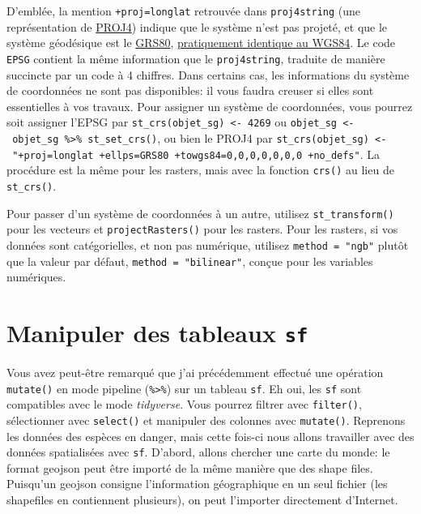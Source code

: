 \documentclass[]{book}
\begin{document}
D'emblée, la mention \texttt{+proj=longlat} retrouvée dans
\texttt{proj4string} (une représentation de
\href{https://proj4.org/}{PROJ4}) indique que le système n'est pas
projeté, et que le système géodésique est le
\href{https://en.wikipedia.org/wiki/Geodetic_Reference_System_1980}{GRS80},
\href{https://mern.gouv.qc.ca/territoire/outils/outils-faq.jsp}{pratiquement
identique au WGS84}. Le code \texttt{EPSG} contient la même information
que le \texttt{proj4string}, traduite de manière succincte par un code à
4 chiffres. Dans certains cas, les informations du système de
coordonnées ne sont pas disponibles: il vous faudra creuser si elles
sont essentielles à vos travaux. Pour assigner un système de
coordonnées, vous pourrez soit assigner l'EPSG par
\texttt{st\_crs(objet\_sg)\ \textless{}-\ 4269} ou
\texttt{objet\_sg\ \textless{}-\ objet\_sg\ \%\textgreater{}\%\ st\_set\_crs()},
ou bien le PROJ4 par
\texttt{st\_crs(objet\_sg)\ \textless{}-\ "+proj=longlat\ +ellps=GRS80\ +towgs84=0,0,0,0,0,0,0\ +no\_defs"}.
La procédure est la même pour les rasters, mais avec la fonction
\texttt{crs()} au lieu de \texttt{st\_crs()}.

Pour passer d'un système de coordonnées à un autre, utilisez
\texttt{st\_transform()} pour les vecteurs et \texttt{projectRasters()}
pour les rasters. Pour les rasters, si vos données sont catégorielles,
et non pas numérique, utilisez \texttt{method\ =\ "ngb"} plutôt que la
valeur par défaut, \texttt{method\ =\ "bilinear"}, conçue pour les
variables numériques.

\hypertarget{manipuler-des-tableaux-sf}{%
\section{\texorpdfstring{Manipuler des tableaux
\texttt{sf}}{Manipuler des tableaux sf}}\label{manipuler-des-tableaux-sf}}

Vous avez peut-être remarqué que j'ai précédemment effectué une
opération \texttt{mutate()} en mode pipeline
(\texttt{\%\textgreater{}\%}) sur un tableau \texttt{sf}. Eh oui, les
\texttt{sf} sont compatibles avec le mode \emph{tidyverse}. Vous pourrez
filtrer avec \texttt{filter()}, sélectionner avec \texttt{select()} et
manipuler des colonnes avec \texttt{mutate()}. Reprenons les données des
espèces en danger, mais cette fois-ci nous allons travailler avec des
données spatialisées avec \texttt{sf}. D'abord, allons chercher une
carte du monde: le format geojson peut être importé de la même manière
que des shape files. Puisqu'un geojson consigne l'information
géographique en un seul fichier (les shapefiles en contiennent
plusieurs), on peut l'importer directement d'Internet.
\end{document}
